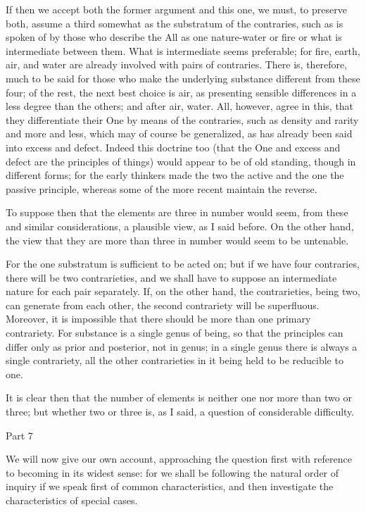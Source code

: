 If then we accept both the former argument and this one, we must,
to preserve both, assume a third somewhat as the substratum of the
contraries, such as is spoken of by those who describe the All as
one nature-water or fire or what is intermediate between them. What
is intermediate seems preferable; for fire, earth, air, and water
are already involved with pairs of contraries. There is, therefore,
much to be said for those who make the underlying substance different
from these four; of the rest, the next best choice is air, as presenting
sensible differences in a less degree than the others; and after air,
water. All, however, agree in this, that they differentiate their
One by means of the contraries, such as density and rarity and more
and less, which may of course be generalized, as has already been
said into excess and defect. Indeed this doctrine too (that the One
and excess and defect are the principles of things) would appear to
be of old standing, though in different forms; for the early thinkers
made the two the active and the one the passive principle, whereas
some of the more recent maintain the reverse. 

To suppose then that the elements are three in number would seem,
from these and similar considerations, a plausible view, as I said
before. On the other hand, the view that they are more than three
in number would seem to be untenable. 

For the one substratum is sufficient to be acted on; but if we have
four contraries, there will be two contrarieties, and we shall have
to suppose an intermediate nature for each pair separately. If, on
the other hand, the contrarieties, being two, can generate from each
other, the second contrariety will be superfluous. Moreover, it is
impossible that there should be more than one primary contrariety.
For substance is a single genus of being, so that the principles can
differ only as prior and posterior, not in genus; in a single genus
there is always a single contrariety, all the other contrarieties
in it being held to be reducible to one. 

It is clear then that the number of elements is neither one nor more
than two or three; but whether two or three is, as I said, a question
of considerable difficulty. 

Part 7

We will now give our own account, approaching the question first with
reference to becoming in its widest sense: for we shall be following
the natural order of inquiry if we speak first of common characteristics,
and then investigate the characteristics of special cases.


